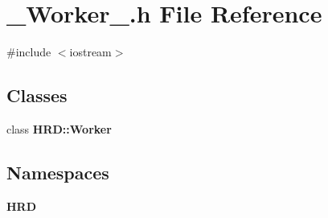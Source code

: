 \section{\+\_\+\+Worker\+\_\+.\+h File Reference}
\label{___worker___8h}
{\ttfamily \#include $<$iostream$>$}\newline
\subsection*{Classes}
\begin{DoxyCompactItemize}
\item 
class \textbf{ H\+R\+D\+::\+Worker}
\end{DoxyCompactItemize}
\subsection*{Namespaces}
\begin{DoxyCompactItemize}
\item 
 \textbf{ H\+RD}
\end{DoxyCompactItemize}
